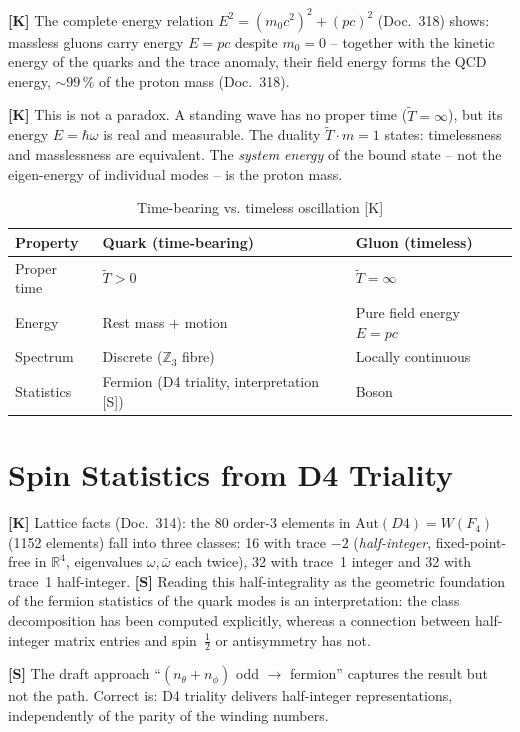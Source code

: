 \textbf{[K]} The complete energy relation
$E^2 = (m_0 c^2)^2 + (pc)^2$ (Doc.~318) shows: massless gluons carry
energy $E = pc$ despite $m_0 = 0$ -- together with the kinetic energy
of the quarks and the trace anomaly, their field energy forms the QCD
energy, $\sim 99\,\%$ of the proton mass (Doc.~318).

\textbf{[K]} This is not a paradox. A standing wave has no proper time
($\tilde{T} = \infty$), but its energy $E = \hbar\omega$ is real and
measurable. The duality $\tilde{T} \cdot m = 1$ states: timelessness
and masslessness are equivalent. The \emph{system energy} of the bound
state -- not the eigen-energy of individual modes -- is the proton mass.

\begin{table}[h]
\centering
\caption{Time-bearing vs. timeless oscillation [K]}
\begin{tabular}{lll}
\toprule
Property & Quark (time-bearing) & Gluon (timeless) \\
\midrule
Proper time & $\tilde{T} > 0$ & $\tilde{T} = \infty$ \\
Energy & Rest mass $+$ motion & Pure field energy $E = pc$ \\
Spectrum & Discrete ($\mathbb{Z}_3$ fibre) & Locally continuous \\
Statistics & Fermion (D4 triality, interpretation [S]) & Boson \\
\bottomrule
\end{tabular}
\end{table}

\section{Spin Statistics from D4 Triality}

\textbf{[K]} Lattice facts (Doc.~314): the 80 order-3 elements in
$\text{Aut}(D4) = W(F_4)$ (1152 elements) fall into three classes:
16 with trace $-2$ (\emph{half-integer}, fixed-point-free in $\mathbb{R}^4$,
eigenvalues $\omega,\bar\omega$ each twice), 32 with trace~1 integer and
32 with trace~1 half-integer.
\textbf{[S]} Reading this half-integrality as the geometric foundation of
the fermion statistics of the quark modes is an interpretation: the
class decomposition has been computed explicitly, whereas a connection
between half-integer matrix entries and spin~$\tfrac12$ or antisymmetry
has not.

\textbf{[S]} The draft approach ``$(n_\theta + n_\phi)$ odd $\to$
fermion'' captures the result but not the path. Correct is: D4 triality
delivers half-integer representations, independently of the parity of
the winding numbers.

